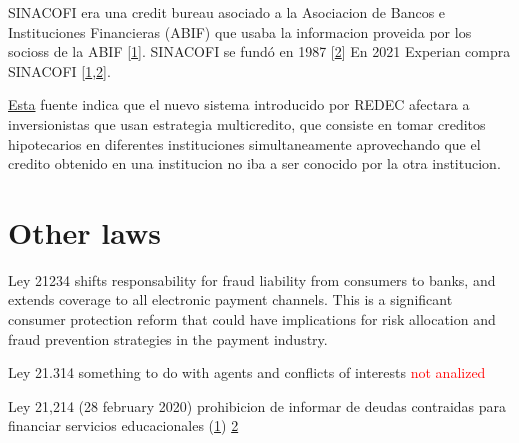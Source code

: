 \documentclass[12pt]{article}
\theoremstyle{plain}
\theoremstyle{plain}
\theoremstyle{definition}  %
\theoremstyle{remark}  %
\begin{document}
 

 

SINACOFI era una credit bureau asociado a la Asociacion de Bancos e Instituciones Financieras (ABIF) que usaba la informacion proveida por los socioss de la ABIF [\href{https://blog.cobranzaonline.com/post/sinacofi-experian-transunion-chile}{1}]. SINACOFI se fundó en 1987 [\href{https://www.alantra.com/ib-transaction/abif-sell-side-advisory-experian/}{2}]
En 2021 Experian compra SINACOFI [\href{https://blog.cobranzaonline.com/post/sinacofi-experian-transunion-chile}{1},\href{https://www.alantra.com/ib-transaction/abif-sell-side-advisory-experian/}{2}]. 



\href{https://www.diarioestrategia.cl/texto-diario/mostrar/5370267/ley-consolidacion-deudas-fin-multicredito-inversionistas-invisibles}{Esta} fuente indica que el nuevo sistema introducido por REDEC afectara a inversionistas que usan estrategia multicredito, que consiste en tomar creditos hipotecarios en diferentes instituciones simultaneamente aprovechando que el credito obtenido en una institucion no iba a ser conocido por la otra institucion. 





 











\section{Other laws}


Ley 21234 shifts responsability for fraud liability from consumers to banks, and extends coverage to all electronic payment channels. This is a significant consumer protection reform that could have implications for risk allocation and fraud prevention strategies in the payment industry.

Ley 21.314 something to do with agents and conflicts of interests \textcolor{red}{not analized}

Ley 21,214 (28 february 2020) prohibicion de informar de deudas contraidas para financiar servicios educacionales (\href{https://www.aguilaycia.cl/post/ley-chao-dicom-en-chile-un-an%C3%A1lisis-exhaustivo}{1})
\href{https://www.cnnchile.com/pais/senado-chao-dicom-deudas-estudiantiles_20190515/}{2}
\end{document}
